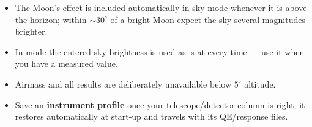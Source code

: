 \begin{itemize}
  \item The Moon's effect is included automatically in  sky mode
        whenever it is above the horizon; within $\sim30^\circ$ of a bright
        Moon expect the sky several magnitudes brighter.
  \item In  mode the entered sky brightness is used as-is
        at every time --- use it when you have a measured value.
  \item Airmass and all results are deliberately unavailable below
        $5^\circ$ altitude.
  \item Save an \textbf{instrument profile} once your telescope/detector
        column is right; it restores automatically at start-up and travels
        with its QE/response files.
\end{itemize}
